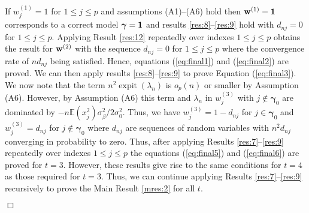 \documentclass[11pt]{article}
\newtheorem{Main Result}{Main Result}
\def\vectorfontone{\bf}
\def\vectorfonttwo{\boldsymbol}
\def\vw{{\vectorfontone w}}                      %
\def\vone{{\vectorfontone 1}}
\def\vgamma{{\vectorfonttwo \gamma}}             %
\def\bE{{\mathbb E}}                             %
\DeclareMathOperator{\expit}{expit}
\begin{document}
{\medskip
{}
If $w_j^{(1)}=1$ for $1\leq j\leq p$ and assumptions (A1)--(A6) hold then $\vw^{(1)}=\vone$ corresponds to a correct model $\vgamma=\vone$ and results
\ref{res:8}--\ref{res:9} hold with $d_{nj} = 0$ for $1\le j\le p$. Applying Result \ref{res:12} repeatedly
over indexes $1\le j\le p$ obtains the result for $\vw^{(2)}$ with the
sequence $d_{nj}=0$ for $1\le j\le p$ where the convergence
rate of $nd_{nj}$ being satisfied.
Hence, equations (\ref{eq:final1}) and (\ref{eq:final2}) are proved.
We can then apply results
\ref{res:8}--\ref{res:9} to prove Equation (\ref{eq:final3}).
We now note that
the term $n^2\expit(\lambda_n)$ is $o_p(n)$ or smaller by
Assumption (A6). However, by Assumption (A6) this term and $\lambda_n$ in $w_j^{(3)}$ with $j\notin\vgamma_0$
are dominated by
$-n\bE (x_j^2)\sigma^2_\beta/2\sigma^2_0$.
Thus, we have
$w_{j}^{(3)} = 1 - d_{nj}$ for $j\in \vgamma_0$ and $w_{j}^{(3)}=d_{nj}$
for $j\notin\vgamma_0$ where $d_{nj}$ are sequences of random variables
with $n^2d_{nj}$ converging in probability to zero. Thus, after applying
Results \ref{res:7}--\ref{res:9} repeatedly over indexes
$1\le j\le p$
the equations (\ref{eq:final5}) and (\ref{eq:final6})
are proved for $t=3$. However, these results give rise to the same
conditions for $t=4$ as those required for $t=3$. Thus, we can continue applying Results
\ref{res:7}--\ref{res:9} recursively to prove the Main Result \ref{mres:2} for all $t$.
\vspace{-0.5cm}\begin{flushright}$\Box$\end{flushright}


}
\end{document}
